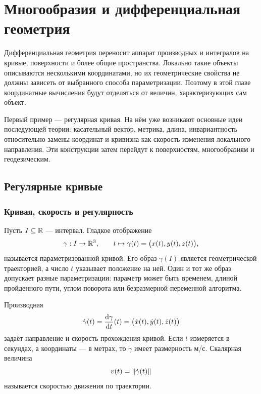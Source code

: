 \chapter{Многообразия и дифференциальная геометрия}
\label{chap:manifolds-differential-geometry}

Дифференциальная геометрия переносит аппарат производных и интегралов на кривые, поверхности и более общие пространства. Локально такие объекты описываются несколькими координатами, но их геометрические свойства не должны зависеть от выбранного способа параметризации. Поэтому в этой главе координатные вычисления будут отделяться от величин, характеризующих сам объект.

Первый пример --- регулярная кривая. На нём уже возникают основные идеи последующей теории: касательный вектор, метрика, длина, инвариантность относительно замены координат и кривизна как скорость изменения локального направления. Эти конструкции затем перейдут к поверхностям, многообразиям и геодезическим.

\section{Регулярные кривые}
\label{sec:regular-curves}

\subsection{Кривая, скорость и регулярность}

Пусть \(I\subseteq\mathbb{R}\) --- интервал. Гладкое отображение
\[
\gamma:I\to\mathbb{R}^3,
\qquad
 t\mapsto\gamma(t)
 =\bigl(x(t),y(t),z(t)\bigr),
\]
называется параметризованной кривой. Его образ \(\gamma(I)\) является геометрической траекторией, а число \(t\) указывает положение на ней. Один и тот же образ допускает разные параметризации: параметр может быть временем, длиной пройденного пути, углом поворота или безразмерной переменной алгоритма.

Производная
\begin{equation}
\label{eq:curve-velocity}
\dot\gamma(t)
=\frac{\mathop{}\!\mathrm{d} \gamma}{\mathop{}\!\mathrm{d} t}(t)
=\bigl(\dot x(t),\dot y(t),\dot z(t)\bigr)
\end{equation}
задаёт направление и скорость прохождения кривой. Если \(t\) измеряется в секундах, а координаты --- в метрах, то \(\dot\gamma\) имеет размерность м/с. Скалярная величина
\begin{equation}
\label{eq:curve-speed}
v(t)=\lVert\dot\gamma(t)\rVert
\end{equation}
называется скоростью движения по траектории.


